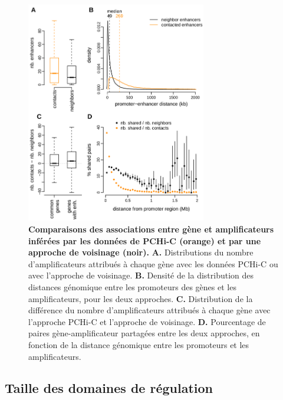 \begin{figure}[H]
    \centering
    \includegraphics[width=0.7\textwidth, page=1] {figures/chap2/chap2-fig5.png}
    \caption[Comparaisons des associations entre gène et amplificateurs inférées par les données de \gls{PCHi-C} et par une approche de voisinage.]{
    \textbf{Comparaisons des associations entre gène et amplificateurs inférées par les données de \gls{PCHi-C} (orange) et par une approche de voisinage (noir).}
    \textbf{A.} Distributions du nombre d'amplificateurs attribués à chaque gène avec les données \gls{PCHi-C} ou avec l'approche de voisinage.
    \textbf{B.} Densité de la distribution des distances génomique entre les promoteurs des gènes et les amplificateurs, pour les deux approches. 
    \textbf{C.} Distribution de la différence du nombre d'amplificateurs attribués à chaque gène avec l'approche \gls{PCHi-C} et l'approche de voisinage. 
    \textbf{D.} Pourcentage de paires gène-amplificateur partagées entre les deux approches, en fonction de la distance génomique entre les promoteurs et les amplificateurs.
    }
    \label{fig:chap2-fig5}
\end{figure} 

\subsection{Taille des domaines de régulation}
\label{subsec:taille-domaine}

